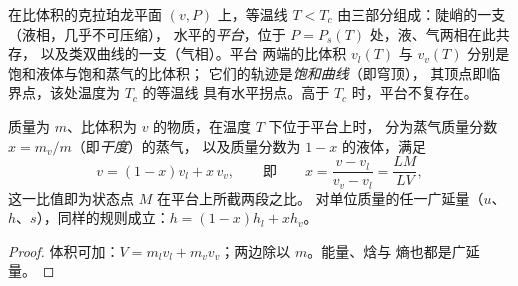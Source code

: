 \begin{proposition}[安德鲁斯等温线]\label{prop:b1:phase-changes:andrews}
在比体积的克拉珀龙平面 $(v, P)$ 上，等温线
$T < T_c$ 由三部分组成：陡峭的一支（液相，几乎不可压缩），
水平的\emph{平台}，位于 $P = P_s(T)$ 处，液、气两相在此共存，
以及类双曲线的一支（气相）。平台
两端的比体积 $v_l(T)$ 与 $v_v(T)$ 分别是饱和液体与饱和蒸气的比体积；
它们的轨迹是\emph{饱和曲线}（即穹顶），
其顶点即临界点，该处温度为 $T_c$ 的等温线
具有水平拐点。高于 $T_c$ 时，平台不复存在。
\end{proposition}
\admitted

\begin{theorem}[杠杆规则]\label{thm:b1:phase-changes:lever}
质量为 $m$、比体积为 $v$ 的物质，在温度 $T$ 下位于平台上时，
分为蒸气质量分数 $x = m_v/m$（即\emph{干度}）的蒸气，
以及质量分数为 $1 - x$ 的液体，满足
\[
v = (1 - x)v_l + x\,v_v , \qquad\text{即}\qquad
x = \frac{v - v_l}{v_v - v_l} = \frac{LM}{LV} ,
\]
这一比值即为状态点 $M$ 在平台上所截两段之比。
对单位质量的任一广延量（$u$、
$h$、$s$），同样的规则成立：$h = (1 - x)h_l + xh_v$。
\end{theorem}

\begin{proof}
体积可加：$V = m_lv_l + m_vv_v$；两边除以 $m$。能量、焓与
熵也都是广延量。
\end{proof}

